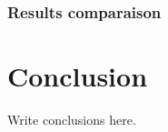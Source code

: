 \documentclass[12pt,a4paper,openright,twoside]{book}
\begin{document}
\subsection{Results comparaison}

\chapter{Conclusion}
\label{chap:conclusions}

Write conclusions here.



\backmatter




\end{document}
